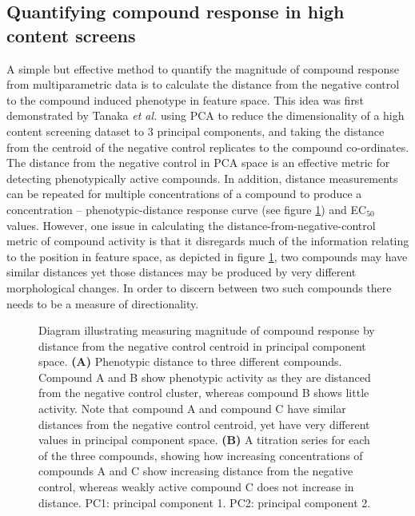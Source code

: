 \documentclass[a4paper,11pt,twoside,openright]{scrbook}
\begin{document}
\subsection{Quantifying compound response in high content screens}
A simple but effective method to quantify the magnitude of compound response from multiparametric data is to calculate the distance from the negative control to the compound induced phenotype in feature space.
This idea was first demonstrated by Tanaka \textit{et al.} using PCA to reduce the dimensionality of a high content screening dataset to 3 principal components, and taking the distance from the centroid of the negative control replicates to the compound co-ordinates. \cite{Tanaka2005}
The distance from the negative control in PCA space is an effective metric for detecting phenotypically active compounds.
In addition, distance measurements can be repeated for multiple concentrations of a compound to produce a concentration -- phenotypic-distance response curve (see figure \ref{figure:pca_dist}) and EC$_{50}$ values.
However, one issue in calculating the distance-from-negative-control metric of compound activity is that it disregards much of the information relating to the position in feature space, as depicted in figure \ref{figure:pca_dist}, two compounds may have similar distances yet those distances may be produced by very different morphological changes.
In order to discern between two such compounds there needs to be a measure of directionality.

\begin{figure}
    \captionsetup{width=0.8\textwidth}
    \caption[Compound distance in principal component space]{
    Diagram illustrating measuring magnitude of compound response by distance from the negative control centroid in principal component space.
    \textbf{(A)} Phenotypic distance to three different compounds.
    Compound A and B show phenotypic activity as they are distanced from the negative control cluster, whereas compound B shows little activity.
    Note that compound A and compound C have similar distances from the negative control centroid, yet have very different values in principal component space.
    \textbf{(B)} A titration series for each of the three compounds, showing how increasing concentrations of compounds A and C show increasing distance from the negative control, whereas weakly active compound C does not increase in distance.
PC1: principal component 1. PC2: principal component 2.
}
    
    \label{figure:pca_dist}
\end{figure}
\end{document}
